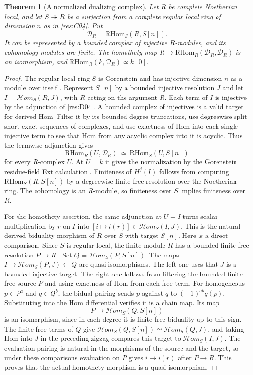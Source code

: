 \documentclass[11pt,oneside,openany]{book}
\newtheorem{theorem}{Theorem}[chapter]
\theoremstyle{definition}
\theoremstyle{remark}
\begin{document}
\begin{theorem}[A normalized dualizing complex]\label{res:D05}
Let $R$ be complete Noetherian local, and let $S\twoheadrightarrow R$ be a surjection
from a complete regular local ring of dimension $n$ as in \ref{res:C04}.
Put
\[
          \mathcal D_R=\mathrm{RHom}_S(R,S[n]).
\]
It can be represented by a bounded complex of injective $R$-modules,
and its cohomology modules are finite. The homothety map
$R\longrightarrow\mathrm{RHom}_R(\mathcal D_R,\mathcal D_R)$ is an
isomorphism, and $\mathrm{RHom}_R(k,\mathcal D_R)\simeq k[0]$.
\end{theorem}
\begin{proof}
The regular local ring $S$ is Gorenstein and has injective
dimension $n$ as a module over itself \cite[GC-06--GC-07]{core}.
Represent $S[n]$ by a bounded injective resolution $J$ and let
$I=\mathcal H om_S(R,J)$, with $R$ acting on the argument $R$.
Each term of $I$ is injective by the adjunction of \ref{res:D04}.
A bounded complex of injectives is a valid target for derived
Hom. Filter it by its bounded degree truncations, use degreewise
split short exact sequences of complexes, and use exactness of
Hom into each single injective term to see that Hom from any
acyclic complex into it is acyclic. Thus the termwise adjunction
gives
\[
        \mathrm{RHom}_R(U,\mathcal D_R)
        \ \simeq\ \mathrm{RHom}_S(U,S[n])
\]
for every $R$-complex $U$. At $U=k$ it gives the normalization by
the Gorenstein residue-field Ext calculation \cite[GC-06]{core}.
Finiteness of $H^j(I)$ follows from computing $\mathrm{RHom}_S(R,S[n])$
by a degreewise finite free resolution over the Noetherian ring.
The cohomology is an $R$-module, so finiteness over $S$ implies
finiteness over $R$.

For the homothety assertion, the same adjunction at $U=I$
turns scalar multiplication by $r$ on $I$ into
$[i\mapsto i(r)]\in\mathcal H om_S(I,J)$. This is the natural
derived biduality morphism of $R$ over $S$ with target $S[n]$.
Here is a direct comparison. Since $S$ is regular local, the
finite module $R$ has a bounded finite free resolution
$P\to R$ \cite[CM-12]{core}. Set
$Q=\mathcal H om_S(P,S[n])$. The maps
$I\to\mathcal H om_S(P,J)\leftarrow Q$ are quasi-isomorphisms.
The left one uses that $J$ is a bounded injective target.
The right one follows from filtering the bounded finite free
source $P$ and using exactness of Hom from each free term.
For homogeneous $p\in P^a$ and $q\in Q^b$, the bidual pairing
sends $p$ against $q$ to $(-1)^{ab}q(p)$. Substituting into the
Hom differential verifies it is a chain map. Its map
\[
          P\longrightarrow \mathcal H om_S(Q,S[n])
\]
is an isomorphism, since in each degree it is finite free
biduality up to this sign. The finite free terms of $Q$ give
$\mathcal H om_S(Q,S[n])\simeq \mathcal H om_S(Q,J)$, and taking
Hom into $J$ in the preceding zigzag compares this target to
$\mathcal H om_S(I,J)$. The evaluation pairing is natural in
the morphisms of the source and the target, so under these
comparisons evaluation on $P$ gives $i\mapsto i(r)$ after
$P\to R$. This proves that the actual homothety morphism is
a quasi-isomorphism.
\end{proof}
\end{document}
